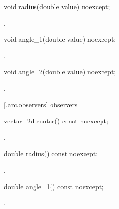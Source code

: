 \begin{itemdecl}
    void radius(double value) noexcept;
\end{itemdecl}
\begin{itemdescr}
	\pnum
	\postconditions
	.
	
\end{itemdescr}

\begin{itemdecl}
    void angle_1(double value) noexcept;
\end{itemdecl}
\begin{itemdescr}
	\pnum
	\postconditions
	.
	
\end{itemdescr}

\begin{itemdecl}
    void angle_2(double value) noexcept;
\end{itemdecl}
\begin{itemdescr}
	\pnum
	\postconditions
	.
	
\end{itemdescr}

 [\iotwod.arc.observers]{ observers}

\begin{itemdecl}
    vector_2d center() const noexcept;
\end{itemdecl}
\begin{itemdescr}
	\pnum
	\returns
	.

\end{itemdescr}

\begin{itemdecl}
    double radius() const noexcept;
\end{itemdecl}
\begin{itemdescr}
	\pnum
	\returns
	.

\end{itemdescr}

\begin{itemdecl}
    double angle_1() const noexcept;
\end{itemdecl}
\begin{itemdescr}
	\pnum
	\returns
	.

\end{itemdescr}

